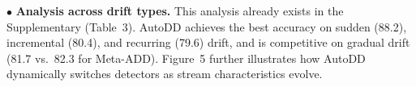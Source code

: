 \documentclass{article}
\begin{document}
\noindent$\bullet$ \textbf{Analysis across drift types.}
This analysis already exists in the Supplementary (Table~3). AutoDD achieves the best accuracy on sudden (88.2), incremental (80.4), and recurring (79.6) drift, and is competitive on gradual drift (81.7 vs.\ 82.3 for Meta-ADD). Figure~5 further illustrates how AutoDD dynamically switches detectors as stream characteristics evolve.
\end{document}
